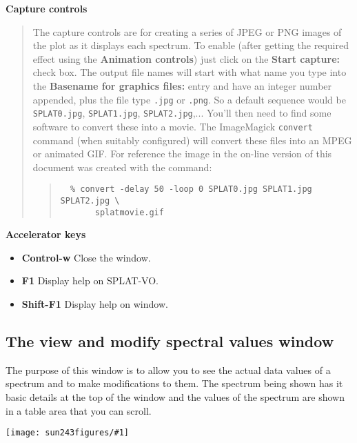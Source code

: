 \documentclass[twoside,11pt]{article}
\newcommand{\htmladdimg}[1]{}
\newcommand{\latexhtml}[2]{#1}
\renewcommand{\_}{\texttt{\symbol{95}}}
\newcommand{\SPLAT}{\textsf{SPLAT-VO}}
\newcommand{\mainfigure}[1]
{\begin{center}
 \latexhtml{\texttt{[image: sun243\_figures/\#1]}}{\htmladdimg{#1.gif}}
 \end{center}
}
\newcommand{\labelitem}[1]{\textbf{#1}}
\newcommand{\hitext}[1]{\texttt{#1}}
\newcommand{\subheading}[1]{\textbf{\large{#1}}}
\begin{document}
\subheading{Capture controls}
\begin{quote}
 The capture controls are for creating a series of JPEG or PNG images of the
 plot as it displays each spectrum. To enable (after getting the
 required effect using the \labelitem{Animation controls}) just click
 on the \labelitem{Start capture:} check box. The output file names
 will start with what name you type into the \labelitem{Basename for
 graphics files:} entry and have an integer number appended, plus the file type
 \hitext{.jpg} or \hitext{.png}. So a default sequence would be
 \hitext{SPLAT0.jpg}, \hitext{SPLAT1.jpg}, \hitext{SPLAT2.jpg},...
 You'll then need to find some software to convert these into a movie.
 The ImageMagick \hitext{convert} command (when suitably configured)
 will convert these files into an MPEG or animated GIF.
 \latexhtml{For reference the image in the on-line version of this
 document was created with the command:}{The image below was created
 with the command (note that the images were also scaled):}
 \begin{quote}
 \begin{verbatim}
  % convert -delay 50 -loop 0 SPLAT0.jpg SPLAT1.jpg SPLAT2.jpg \
       splatmovie.gif
 \end{verbatim}
 \end{quote}
 \htmladdimg{splatmovie.gif}
\end{quote}

\subheading{Accelerator keys}

\begin{itemize}
\item \labelitem{Control-w} Close the window.
\item \labelitem{F1} Display help on \SPLAT.
\item \labelitem{Shift-F1} Display help on window.
\end{itemize}

\newpage
\subsection{The view and modify spectral values window}

The purpose of this window is to allow you to see the actual data
values of a spectrum and to make modifications to them.
The spectrum being shown has it basic details at the top of the window
and the values of the spectrum are shown in a table area that you can
scroll.

\mainfigure{viewwindow}
\end{document}
